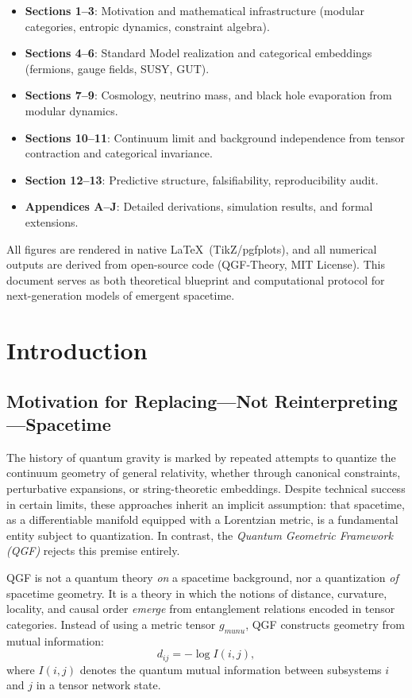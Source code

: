 \documentclass[11pt]{article}
\def\mu{mu}
\def\nu{nu}
\begin{document}
\begin{itemize}
  \item \textbf{Sections 1–3}: Motivation and mathematical infrastructure (modular categories, entropic dynamics, constraint algebra).
  \item \textbf{Sections 4–6}: Standard Model realization and categorical embeddings (fermions, gauge fields, SUSY, GUT).
  \item \textbf{Sections 7–9}: Cosmology, neutrino mass, and black hole evaporation from modular dynamics.
  \item \textbf{Sections 10–11}: Continuum limit and background independence from tensor contraction and categorical invariance.
  \item \textbf{Section 12–13}: Predictive structure, falsifiability, reproducibility audit.
  \item \textbf{Appendices A–J}: Detailed derivations, simulation results, and formal extensions.
\end{itemize}

All figures are rendered in native \LaTeX\ (TikZ/pgfplots), and all numerical outputs are derived from open-source code (QGF-Theory, MIT License). This document serves as both theoretical blueprint and computational protocol for next-generation models of emergent spacetime.

\tableofcontents
\newpage

\section{Introduction}

\subsection{Motivation for Replacing—Not Reinterpreting—Spacetime}

The history of quantum gravity is marked by repeated attempts to quantize the continuum geometry of general relativity, whether through canonical constraints, perturbative expansions, or string-theoretic embeddings. Despite technical success in certain limits, these approaches inherit an implicit assumption: that spacetime, as a differentiable manifold equipped with a Lorentzian metric, is a fundamental entity subject to quantization. In contrast, the \textit{Quantum Geometric Framework (QGF)} rejects this premise entirely.

QGF is not a quantum theory \emph{on} a spacetime background, nor a quantization \emph{of} spacetime geometry. It is a theory in which the notions of distance, curvature, locality, and causal order \textit{emerge} from entanglement relations encoded in tensor categories. Instead of using a metric tensor \( g_{\mu\nu} \), QGF constructs geometry from mutual information:
\[
d_{ij} = -\log I(i,j),
\]
where \( I(i,j) \) denotes the quantum mutual information between subsystems \( i \) and \( j \) in a tensor network state.
\end{document}
